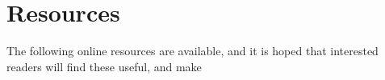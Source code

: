 \section{Resources}

The following online resources are available, and it is hoped that interested readers will find these useful, and make 